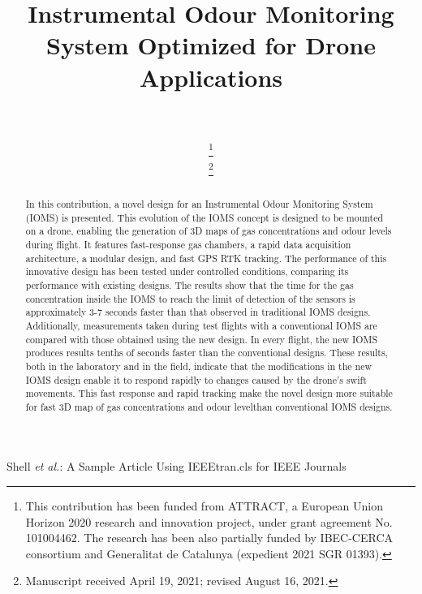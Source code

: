 \documentclass[lettersize,journal]{IEEEtran}
\begin{document}
\title{Instrumental Odour Monitoring System Optimized for Drone Applications}

\author{
\\



\thanks{This contribution has been funded from ATTRACT, a European Union Horizon 2020 research and innovation project, under grant agreement No. 101004462. The research has been also partially funded by IBEC-CERCA consortium and Generalitat de Catalunya (expedient 2021 SGR 01393).}

\thanks{Manuscript received April 19, 2021; revised August 16, 2021.}}

%
{Shell \MakeLowercase{\textit{et al.}}: A Sample Article Using IEEEtran.cls for IEEE Journals}


\maketitle

\begin{abstract}
In this contribution, a novel design for an Instrumental Odour Monitoring System (IOMS) is presented. This evolution of the IOMS concept is designed to be mounted on a drone, enabling the generation of 3D maps of gas concentrations and odour levels during flight. It features fast-response gas chambers, a rapid data acquisition architecture, a modular design, and fast GPS RTK tracking. The performance of this innovative design has been tested under controlled conditions, comparing its performance with existing designs. The results show that the time for the gas concentration inside the IOMS to reach the limit of detection of the sensors is approximately 3-7 seconds faster than that observed in traditional IOMS designs. Additionally, measurements taken during test flights with a conventional IOMS are compared with those obtained using the new design. In every flight, the new IOMS produces results tenths of seconds faster than the conventional designs. These results, both in the laboratory and in the field, indicate that the modifications in the new IOMS design enable it to respond rapidly to changes caused by the drone's swift movements. This fast response and rapid tracking make the novel design more suitable for fast 3D map of gas concentrations and odour levelthan conventional IOMS designs.  
\end{abstract}
\end{document}

